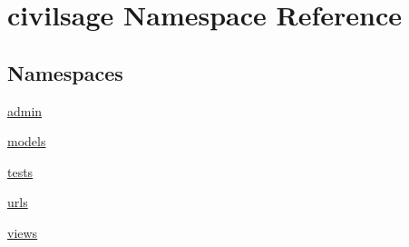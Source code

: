 \hypertarget{namespacecivilsage}{}\section{civilsage Namespace Reference}
\label{namespacecivilsage}
\subsection*{Namespaces}
\begin{DoxyCompactItemize}
\item 
 \hyperlink{namespacecivilsage_1_1admin}{admin}
\item 
 \hyperlink{namespacecivilsage_1_1models}{models}
\item 
 \hyperlink{namespacecivilsage_1_1tests}{tests}
\item 
 \hyperlink{namespacecivilsage_1_1urls}{urls}
\item 
 \hyperlink{namespacecivilsage_1_1views}{views}
\end{DoxyCompactItemize}
